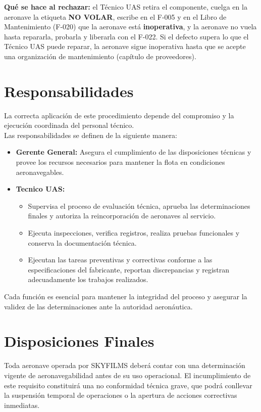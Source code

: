 \textbf{Qué se hace al rechazar:} el Técnico UAS retira el componente, cuelga en la aeronave la etiqueta \textbf{NO VOLAR}, escribe en el F-005 y en el Libro de Mantenimiento (F-020) que la aeronave está \textbf{inoperativa}, y la aeronave no vuela hasta repararla, probarla y liberarla con el F-022. Si el defecto supera lo que el Técnico UAS puede reparar, la aeronave sigue inoperativa hasta que se acepte una organización de mantenimiento (capítulo de proveedores).

\section{Responsabilidades}
La correcta aplicación de este procedimiento depende del compromiso y la ejecución coordinada del personal técnico.\\

Las responsabilidades se definen de la siguiente manera:

\begin{itemize}
    \item \textbf{Gerente General:} Asegura el cumplimiento de las disposiciones técnicas y provee los recursos necesarios para mantener la flota en condiciones aeronavegables.

    \item \textbf{Tecnico UAS:}
        \begin{itemize}
            \item Supervisa el proceso de evaluación técnica, aprueba las determinaciones finales y autoriza la reincorporación de aeronaves al servicio.

            \item Ejecuta inspecciones, verifica registros, realiza pruebas funcionales y conserva la documentación técnica.

            \item Ejecutan las tareas preventivas y correctivas conforme a las especificaciones del fabricante, reportan discrepancias y registran adecuadamente los trabajos realizados.

        \end{itemize}

\end{itemize}

Cada función es esencial para mantener la integridad del proceso y asegurar la validez de las determinaciones ante la autoridad aeronáutica.

\section{Disposiciones Finales}
Toda aeronave operada por SKYFILMS deberá contar con una determinación vigente de aeronavegabilidad antes de su uso operacional. El incumplimiento de este requisito constituirá una no conformidad técnica grave, que podrá conllevar la suspensión temporal de operaciones o la apertura de acciones correctivas inmediatas.\\

